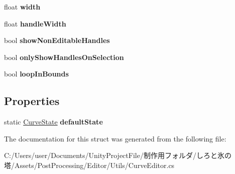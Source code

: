 \begin{DoxyCompactItemize}
float {\bfseries width}
\item 
\mbox{\label{struct_unity_editor_1_1_post_processing_1_1_curve_editor_1_1_curve_state_aa6ad60ca2b5f41ebea15dd2d3ae04ea5}} 
float {\bfseries handle\+Width}
\item 
\mbox{\label{struct_unity_editor_1_1_post_processing_1_1_curve_editor_1_1_curve_state_adec4e2428c2e0b45f2694c7e8fa27977}} 
bool {\bfseries show\+Non\+Editable\+Handles}
\item 
\mbox{\label{struct_unity_editor_1_1_post_processing_1_1_curve_editor_1_1_curve_state_ab2ec9070b560ab71548f0c78e34a7c5f}} 
bool {\bfseries only\+Show\+Handles\+On\+Selection}
\item 
\mbox{\label{struct_unity_editor_1_1_post_processing_1_1_curve_editor_1_1_curve_state_abb8b6af015fa2f97da6bc16a573f1bf7}} 
bool {\bfseries loop\+In\+Bounds}
\end{DoxyCompactItemize}
\subsection*{Properties}
\begin{DoxyCompactItemize}
\item 
\mbox{\label{struct_unity_editor_1_1_post_processing_1_1_curve_editor_1_1_curve_state_a525752786a73cecd0e5efa7ae3856e67}} 
static \hyperlink{struct_unity_editor_1_1_post_processing_1_1_curve_editor_1_1_curve_state}{Curve\+State} {\bfseries default\+State}
\end{DoxyCompactItemize}


The documentation for this struct was generated from the following file\+:\begin{DoxyCompactItemize}
\item 
C\+:/\+Users/user/\+Documents/\+Unity\+Project\+File/制作用フォルダ/しろと氷の塔/\+Assets/\+Post\+Processing/\+Editor/\+Utils/Curve\+Editor.\+cs\end{DoxyCompactItemize}
